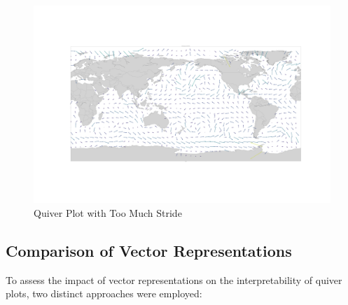\documentclass[conference]{IEEEtran}
\begin{document}
\begin{itemize}
  \begin{figure}[h]
    \centering
    \includegraphics[width=0.7\linewidth]{images_ricky/quiver_plot_stride_15.png}
    \caption{Quiver Plot with Too Much Stride}
    \label{fig:too_much_stride}
  \end{figure}

\end{itemize}

\subsection{Comparison of Vector Representations}

To assess the impact of vector representations on the interpretability of quiver plots, two distinct approaches were employed:
\end{document}
